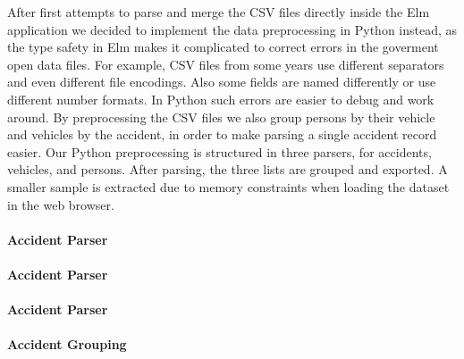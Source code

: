 After first attempts to parse and merge the CSV files directly inside the Elm application we decided to implement the data preprocessing in Python instead, as the type safety in Elm makes it complicated to correct errors in the goverment open data files. For example, CSV files from some years use different separators and even different file encodings. Also some fields are named differently or use different number formats. In Python such errors are easier to debug and work around. By preprocessing the CSV files we also group persons by their vehicle and vehicles by the accident, in order to make parsing a single accident record easier. Our Python preprocessing is structured in three parsers, for accidents, vehicles, and persons. After parsing, the three lists are grouped and exported. A smaller sample is extracted due to memory constraints when loading the dataset in the web browser.

\paragraph{Accident Parser}

\paragraph{Accident Parser}

\paragraph{Accident Parser}

\paragraph{Accident Grouping}



